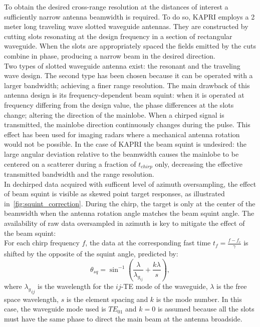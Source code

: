  To obtain the desired cross-range resolution at the distances of interest a sufficiently narrow antenna beamwidth is required. To do so, KAPRI employs a 2 meter long traveling wave slotted waveguide antennas\cite{Hines1953a,Granet2007}. They are constructed by cutting slots resonating at the design frequency in a section of rectangular waveguide. When the slots are appropriately spaced the fields emitted by the cuts combine in phase, producing a narrow beam in the desired direction.\\ Two types of slotted waveguide antenna exist\cite{Enjiu2013}: the resonant and the traveling wave design. The second type has been chosen because it can be operated with a larger bandwidth; achieving a finer range resolution. The main drawback of this antenna design is its frequency-dependent beam squint: when it is operated at frequency differing from the design value, the phase differences at the slots change; altering the direction of the mainlobe. When a chirped signal is transmitted, the mainlobe direction continuously changes during the pulse. This effect has been used for imaging radars where a mechanical antenna rotation would not be possible\cite{Yang2014,Yang2012,Mayer2003,Alvarez2013}. In the case of KAPRI the beam squint is undesired: the large angular deviation relative to the beamwidth causes the mainlobe to be centered on a scatterer during a fraction of $t_{chirp}$ only, decreasing the effective transmitted bandwidth and the range resolution.\\ 
In dechirped data acquired with sufficent level of azimuth oversampling, the effect of beam squint is visible as skewed point target responses, as illustrated in~\autoref{fig:squint_correction}. During the chirp, the target is only at the center of the beamwidth when the antenna rotation angle matches the beam squint angle. 
The availability of raw data oversampled in azimuth is key to mitigate the effect of the beam squint:\\ For each chirp frequency $f$, the data at the corresponding fast time $t_{f} = \frac{f - f_c}{\gamma}$  is shifted by the opposite of the squint angle, predicted by:
\begin{equation}\label{eq:squint_exact}
	\theta_{sq} = \sin^{-1}\left(\frac{\lambda}{\lambda_{g_{ij}}} + \frac{k \lambda}{s}\right),
\end{equation}
where ${\lambda_g}_{ij}$ is the wavelength for the $ij$-TE mode of the waveguide, $\lambda$ is the free space wavelength, $s$ is the element spacing and $k$ is the mode number. In this case, the waveguide mode used is $TE_{01}$ and $k=0$ is assumed because all the slots must have the same phase\cite{kraus88} to direct the main beam at the antenna broadside.\\
